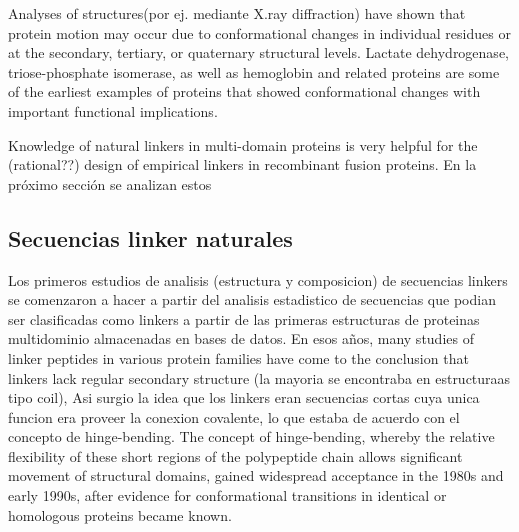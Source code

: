 Analyses of structures(por ej. mediante X.ray diffraction) have shown that protein motion may occur due to conformational changes in individual residues or at the secondary, tertiary, or quaternary structural levels. Lactate dehydrogenase, triose-phosphate isomerase, as well as hemoglobin and related proteins are some of the earliest examples of proteins that showed conformational changes with important functional implications.





Knowledge of natural linkers in multi-domain proteins is very helpful for the (rational??) design of empirical linkers in recombinant fusion proteins. 
En la próximo sección se analizan estos
























\subsection{Secuencias linker naturales}



Los primeros estudios de analisis (estructura y composicion) de secuencias linkers\cite{argos1990investigation} se comenzaron a hacer a partir del analisis estadistico de secuencias que podian ser clasificadas 
como linkers a partir de las primeras estructuras de proteinas multidominio almacenadas en bases de datos.
En esos años, many studies of linker peptides in various protein families have come to the conclusion that linkers lack regular secondary structure (la mayoria se encontraba en estructuraas tipo coil), 
Asi surgio la idea que los linkers eran secuencias cortas cuya unica funcion era proveer la conexion covalente, lo que estaba de acuerdo con el concepto de hinge-bending.
The concept of hinge-bending, whereby the relative flexibility of these short regions of the polypeptide chain allows significant movement of structural domains, gained widespread acceptance in
the 1980s and early 1990s, after evidence for conformational transitions in identical or homologous proteins became known.


